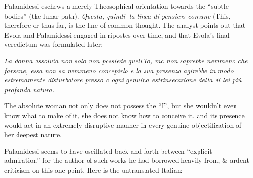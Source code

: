 Palamidessi eschews a merely Theosophical orientation towards the ``subtle bodies'' (the lunar path).
\emph{Questa, quindi, la linea di pensiero comune} (This, therefore or thus far, is the line of common thought. The analyst points out that Evola and Palamidessi engaged in ripostes over time, and that Evola's final veredictum was formulated later:

\begin{quotex}
\textit{La donna assoluta non solo non possiede quell'Io, ma non saprebbe nemmeno che farsene, essa non sa nemmeno concepirlo e la sua presenza agirebbe in modo estremamente disturbatore presso a ogni genuina estrinsecazione della di lei più profonda natura.}

The absolute woman not only does not possess the ``I'', but she wouldn't even know what to make of it, she does not know how to conceive it, and its presence would act in an extremely disruptive manner in every genuine objectification of her deepest nature.
\end{quotex}


Palamidessi seems to have oscillated back and forth between ``explicit admiration'' for the author of such works he had borrowed heavily from, \& ardent criticism on this one point. Here is the untranslated Italian:


